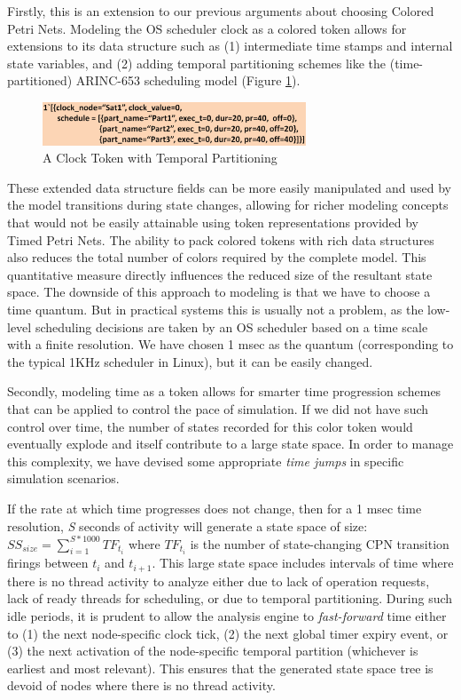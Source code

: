 Firstly, this is an extension to our previous arguments about choosing Colored Petri Nets. Modeling the OS scheduler clock as a colored token allows for extensions to its data structure such as (1) intermediate time stamps and internal state variables, and (2) adding temporal partitioning schemes like the (time-partitioned) ARINC-653 \cite{ARINC-653} scheduling model (Figure \ref{fig:clock}). 

\begin{figure}[h]
	\centering
	\includegraphics[width=0.7\textwidth]{./figs/clock}
	\caption{A Clock Token with Temporal Partitioning}
	\label{fig:clock}
\end{figure}

These extended data structure fields can be more easily manipulated and used by the model transitions during state changes, allowing for richer modeling concepts that would not be easily attainable using token representations provided by Timed Petri Nets. The ability to pack colored tokens with rich data structures also reduces the total number of colors required by the complete model. This quantitative measure directly influences the reduced size of the resultant state space. The downside of this approach to modeling is that we have to choose a time quantum. But in practical systems this is usually not a problem, as the low-level scheduling decisions are taken by an OS scheduler based on a time scale with a finite resolution. We have chosen 1 msec as the quantum (corresponding to the typical 1KHz scheduler in Linux), but it can be easily changed. 

Secondly, modeling time as a token allows for smarter time progression schemes that can be applied to control the pace of simulation. If we did not have such control over time, the number of states recorded for this color token would eventually explode and itself contribute to a large state space. In order to manage this complexity, we have devised some appropriate \emph{time jumps} in specific simulation scenarios. 

If the rate at which time progresses does not change, then for a 1 msec time resolution, \emph{S} seconds of activity will generate a state space of size: $SS_{size} = \sum\limits_{i=1}^{S*1000} TF_{t_i}$ where $TF_{t_i}$ is the number of state-changing CPN transition firings between $t_i$ and $t_{i+1}$. This large state space includes intervals of time where there is no thread activity to analyze either due to lack of operation requests, lack of ready threads for scheduling, or due to temporal partitioning. During such idle periods, it is prudent to allow the analysis engine to \emph{fast-forward} time either to (1) the next node-specific clock tick, (2) the next global timer expiry event, or (3) the next activation of the node-specific temporal partition (whichever is earliest and most relevant). This ensures that the generated state space tree is devoid of nodes where there is no thread activity.

